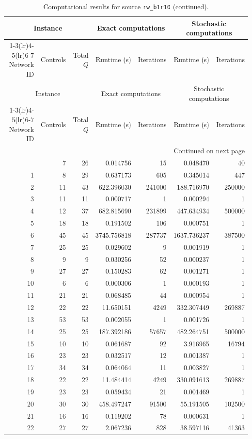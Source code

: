 \documentclass{article}
\begin{document}
\begin{landscape}
\begin{longtable}{rrrrrrr}
\caption{Computational results for source \texttt{rw\_b1r10}.}\\
\toprule
\multicolumn{3}{c}{Instance} & \multicolumn{2}{c}{Exact computations} & \multicolumn{2}{c}{Stochastic computations} \\
\cmidrule(lr){1-3}\cmidrule(lr){4-5}\cmidrule(lr){6-7}
Network ID & Controls & Total $Q$ & Runtime (s) & Iterations & Runtime (s) & Iterations \\
\midrule
\endfirsthead
\caption[]{Computational results for source \texttt{rw\_b1r10} (continued).}\\
\toprule
\multicolumn{3}{c}{Instance} & \multicolumn{2}{c}{Exact computations} & \multicolumn{2}{c}{Stochastic computations} \\
\cmidrule(lr){1-3}\cmidrule(lr){4-5}\cmidrule(lr){6-7}
Network ID & Controls & Total $Q$ & Runtime (s) & Iterations & Runtime (s) & Iterations \\
\midrule
\endhead
\midrule
\multicolumn{7}{r}{Continued on next page} \\
\endfoot
\bottomrule
\endlastfoot
0 & 7 & 26 & 0.014756 & 15 & 0.048470 & 40 \\
1 & 8 & 29 & 0.637173 & 605 & 0.345014 & 447 \\
2 & 11 & 43 & 622.396030 & 241000 & 188.716970 & 250000 \\
3 & 11 & 11 & 0.000717 & 1 & 0.000294 & 1 \\
4 & 12 & 37 & 682.815690 & 231899 & 447.634934 & 500000 \\
5 & 18 & 18 & 0.191502 & 106 & 0.000751 & 1 \\
6 & 45 & 45 & 3745.756818 & 287737 & 1637.736237 & 387500 \\
7 & 25 & 25 & 0.029602 & 9 & 0.001919 & 1 \\
8 & 9 & 9 & 0.030256 & 52 & 0.000237 & 1 \\
9 & 27 & 27 & 0.150283 & 62 & 0.001271 & 1 \\
10 & 6 & 6 & 0.000306 & 1 & 0.000193 & 1 \\
11 & 21 & 21 & 0.068485 & 44 & 0.000954 & 1 \\
12 & 22 & 22 & 11.650151 & 4249 & 332.307449 & 269887 \\
13 & 53 & 53 & 0.002055 & 1 & 0.001726 & 1 \\
14 & 25 & 25 & 187.392186 & 57657 & 482.264751 & 500000 \\
15 & 10 & 10 & 0.061687 & 92 & 3.916965 & 16794 \\
16 & 23 & 23 & 0.032517 & 12 & 0.001387 & 1 \\
17 & 34 & 34 & 0.064064 & 11 & 0.003827 & 1 \\
18 & 22 & 22 & 11.484414 & 4249 & 330.091613 & 269887 \\
19 & 23 & 23 & 0.059434 & 21 & 0.001469 & 1 \\
20 & 30 & 30 & 458.497247 & 91500 & 55.191505 & 102500 \\
21 & 16 & 16 & 0.119202 & 78 & 0.000631 & 1 \\
22 & 27 & 27 & 2.067236 & 828 & 38.597116 & 41363 \\
\end{longtable}


\end{landscape}
\end{document}
